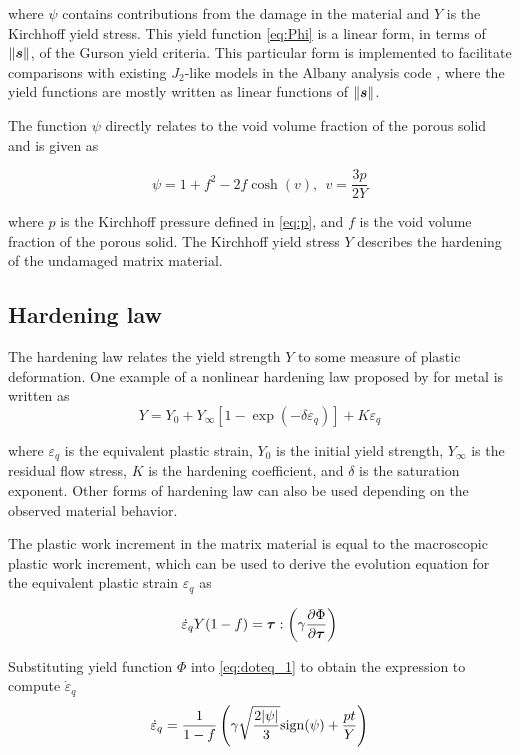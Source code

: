 where $\psi$ contains contributions from the damage in the material and $Y$ is the Kirchhoff yield stress. This yield function \eqref{eq:Phi} is a linear form, in terms of $\|{\boldsymbol{s}}\|$, of the Gurson yield criteria. This particular form is implemented to facilitate comparisons with existing $J_2$-like models in the Albany analysis code \cite{Salinger2013}, where the yield functions are mostly written as linear functions of $\|{\boldsymbol{s}}\|$.

The function $\psi$ directly relates to the void volume fraction of the porous solid and is given as

\begin{equation}
\psi = 1 + f^2 - 2 f \cosh(v), ~~v=\frac{3p}{2 Y}
\end{equation}

where $p$ is the Kirchhoff pressure defined in \eqref{eq:p}, and $f$ is the void volume fraction of the porous solid. The Kirchhoff yield stress $Y$ describes the hardening of the undamaged matrix material. 

\subsection{Hardening law}
The hardening law relates the yield strength $Y$ to some measure of plastic deformation. One example of a nonlinear hardening law proposed by \cite{SimoHughes:98} for metal is written as 
\begin{equation}
Y =  Y_0 + Y_{\infty}\left[ 1-\exp(-\delta\varepsilon_q)\right] + K\varepsilon_q 
\end{equation}

where $\varepsilon_q$ is the equivalent plastic strain, $Y_0$ is the initial yield strength, $Y_{\infty}$ is the residual flow stress, $K$ is the hardening coefficient, and $\delta$ is the saturation exponent. Other forms of hardening law can also be used depending on the observed material behavior.

The plastic work increment in the matrix material is equal to the macroscopic plastic work increment, which can be used to derive the evolution equation for the equivalent plastic strain $\varepsilon_q$ as

\begin{equation}\label{eq:doteq_1}
\dot{\varepsilon}_q Y(1-f) = {\boldsymbol{\tau}} : \left( \gamma\frac{\partial\Phi}{\partial{\boldsymbol{\tau}}} \right)
\end{equation}

Substituting yield function $\Phi$ into \eqref{eq:doteq_1} to obtain the expression to compute $\dot{\varepsilon}_q$
\begin{equation}\label{eq:doteq}
  \dot{\varepsilon}_q =\frac{1}{1-f}\left( \gamma\sqrt{\frac{2|\psi|}{3}} {\rm sign}(\psi) + \frac{p t}{Y} \right)
\end{equation}

